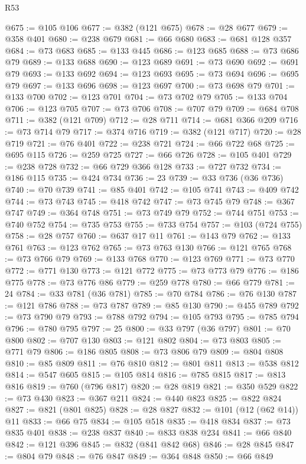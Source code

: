 \begin{lexlean}{R53}
\begin{coremodule}
@675 := @105 @106
@677 := @382 (@121 @675)
@678 := @28 @677
@679 := @358 @401
@680 := @238 @679
@681 := @66 @680
@683 := @681 @128 @357
@684 := @73 @683
@685 := @133 @445
@686 := @123 @685
@688 := @73 @686 @79
@689 := @133 @688
@690 := @123 @689
@691 := @73 @690
@692 := @691 @79
@693 := @133 @692
@694 := @123 @693
@695 := @73 @694
@696 := @695 @79
@697 := @133 @696
@698 := @123 @697
@700 := @73 @698 @79
@701 := @133 @700
@702 := @123 @701
@704 := @73 @702 @79
@705 := @133 @704
@706 := @123 @705
@707 := @73 @706
@708 := @707 @79
@709 := @684 @708
@711 := @382 (@121 @709)
@712 := @28 @711
@714 := @681 @366 @209
@716 := @73 @714 @79
@717 := @374 @716
@719 := @382 (@121 @717)
@720 := @28 @719
@721 := @76 @401
@722 := @238 @721
@724 := @66 @722 @68
@725 := @695 @115
@726 := @259 @725
@727 := @66 @726
@728 := @105 @401
@729 := @238 @728
@732 := @66 @729 @366 @128
@733 := @727 @732
@734 := @186 @115
@735 := @424 @734
@736 := 23
@739 := @33 @736 (@36 @736)
@740 := @70 @739
@741 := @85 @401
@742 := @105 @741
@743 := @409 @742
@744 := @73 @743
@745 := @418 @742
@747 := @73 @745 @79
@748 := @367 @747
@749 := @364 @748
@751 := @73 @749 @79
@752 := @744 @751
@753 := @740 @752
@754 := @735 @753
@755 := @733 @754
@757 := @103 (@724 @755)
@758 := @28 @757
@760 := @637 @17 @11
@761 := @143 @79
@762 := @133 @761
@763 := @123 @762
@765 := @73 @763 @130
@766 := @121 @765
@768 := @73 @766 @79
@769 := @133 @768
@770 := @123 @769
@771 := @73 @770
@772 := @771 @130
@773 := @121 @772
@775 := @73 @773 @79
@776 := @186 @775
@778 := @73 @776 @86
@779 := @259 @778
@780 := @66 @779
@781 := 24
@784 := @33 @781 (@36 @781)
@785 := @70 @784
@786 := @76 @130
@787 := @121 @786
@788 := @73 @787
@789 := @85 @130
@790 := @455 @789
@792 := @73 @790 @79
@793 := @788 @792
@794 := @105 @793
@795 := @785 @794
@796 := @780 @795
@797 := 25
@800 := @33 @797 (@36 @797)
@801 := @70 @800
@802 := @707 @130
@803 := @121 @802
@804 := @73 @803
@805 := @771 @79
@806 := @186 @805
@808 := @73 @806 @79
@809 := @804 @808
@810 := @85 @809
@811 := @76 @810
@812 := @801 @811
@813 := @538 @812
@814 := @547 @605
@815 := @105 @814
@816 := @785 @815
@817 := @813 @816
@819 := @760 (@796 @817)
@820 := @28 @819
@821 := @350 @529
@822 := @73 @430
@823 := @367 @211
@824 := @440 @823
@825 := @822 @824
@827 := @821 (@801 @825)
@828 := @28 @827
@832 := @101 (@12 (@62 @14)) @11
@833 := @66 @75
@834 := @105 @518
@835 := @418 @834
@837 := @73 @835 @401
@838 := @238 @837
@840 := @833 @838 @234
@841 := @66 @840
@842 := @121 @396
@845 := @832 (@841 @842 @68)
@846 := @28 @845
@847 := @804 @79
@848 := @76 @847
@849 := @364 @848
@850 := @66 @849

\end{coremodule}
\end{lexlean}
